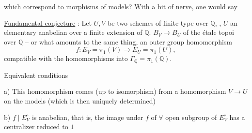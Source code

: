which correspond to morphisms of models? With a bit of nerve, one would say

\uline{Fundamental conjecture} : Let $U,V$ be two schemes of finite type over $\mathbb{Q}$,  , $U$ an elementary anabelian   over a finite extension of $\mathbb{Q}$.     $B_V\longrightarrow B_U$ of the étale topoi over $\mathbb{Q}$ -- or what amounts to the same thing, an outer group homomorphism
\[
f:E_V=\pi_1(V)\longrightarrow E_U=\pi_1(U),
\]
compatible with the  homomorphisms into $\Gamma_{\mathbb{Q}}=\pi_1(\mathbb{Q})$.

Equivalent conditions

 a) This homomorphism comes (up to isomorphism) from a homomorphism $V\longrightarrow U$ on the models (which is then uniquely determined)

 b) $f\mid E_V^\circ$ is anabelian, that is, the image under $f$ of $\forall$ open subgroup of $E_V^\circ$ has a centralizer reduced to $1$
